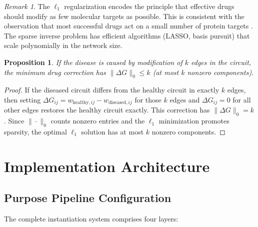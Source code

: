 \documentclass[twocolumn,10pt,a4paper]{article}
\newtheorem{proposition}[theorem]{Proposition}
\theoremstyle{definition}
\theoremstyle{remark}
\newtheorem{remark}[theorem]{Remark}
\begin{document}
\begin{remark}
The $\ell_1$ regularization encodes the principle that effective drugs should modify as few molecular targets as possible. This is consistent with the observation that most successful drugs act on a small number of protein targets \citep{Alon2007book}. The sparse inverse problem has efficient algorithms (LASSO, basis pursuit) that scale polynomially in the network size.
\end{remark}

\begin{proposition}
\label{prop:drug_sparse}
If the disease is caused by modification of $k$ edges in the circuit, the minimum drug correction has $\|\Delta G\|_0 \leq k$ (at most $k$ nonzero components).
\end{proposition}

\begin{proof}
If the diseased circuit differs from the healthy circuit in exactly $k$ edges, then setting $\Delta G_{ij} = w_{\mathrm{healthy},ij} - w_{\mathrm{diseased},ij}$ for those $k$ edges and $\Delta G_{ij} = 0$ for all other edges restores the healthy circuit exactly. This correction has $\|\Delta G\|_0 = k$. Since $\|\cdot\|_0$ counts nonzero entries and the $\ell_1$ minimization promotes sparsity, the optimal $\ell_1$ solution has at most $k$ nonzero components.
\end{proof}

\section{Implementation Architecture}
\label{sec:implementation}

\subsection{Purpose Pipeline Configuration}

The complete instantiation system comprises four layers:
\end{document}
